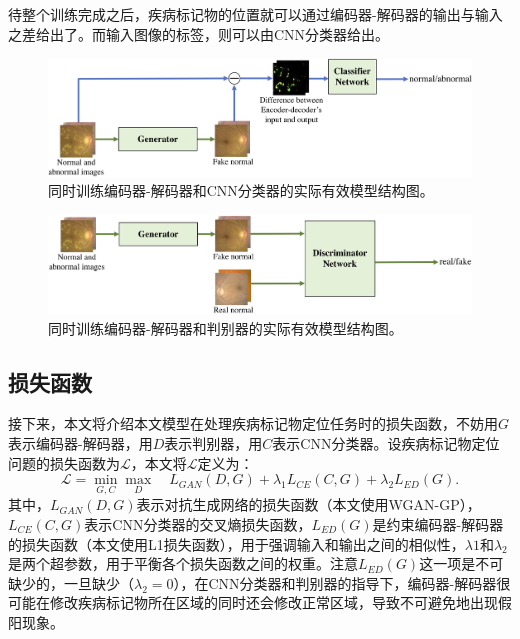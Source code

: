 待整个训练完成之后，疾病标记物的位置就可以通过编码器-解码器的输出与输入之差给出了。而输入图像的标签，则可以由CNN分类器给出。
\begin{figure}[h]
	\centering
	\includegraphics[width=1.0\textwidth]{figure/u_c_architecture.png}
	\caption{同时训练编码器-解码器和CNN分类器的实际有效模型结构图。}
	\label{fig:u_c_architecture}
\end{figure}
\begin{figure}[h]
	\centering
	\includegraphics[width=1.0\textwidth]{figure/u_d_architecture.png}
	\caption{同时训练编码器-解码器和判别器的实际有效模型结构图。}
	\label{fig:u_d_architecture}
\end{figure}
\subsection{损失函数}\label{subsec:loss_func}
接下来，本文将介绍本文模型在处理疾病标记物定位任务时的损失函数，不妨用$G$表示编码器-解码器，用$D$表示判别器，用$C$表示CNN分类器。设疾病标记物定位问题的损失函数为$\mathcal{L}$，本文将$\mathcal{L}$定义为：
\begin{equation}\label{equ:model_loss_func}
\mathcal{L}=\min _{G, C} \max _{D} \quad L_{GAN}(D, G)+\lambda_{1} L_{C E}(C, G)+\lambda_{2} L_{E D}(G).
\end{equation}
其中，$L_{GAN}(D, G)$表示对抗生成网络的损失函数（本文使用WGAN-GP），$L_{CE}(C, G)$表示CNN分类器的交叉熵损失函数，$L_{E D}(G)$是约束编码器-解码器的损失函数（本文使用L1损失函数），用于强调输入和输出之间的相似性，$\lambda{1}$和$\lambda_{2}$是两个超参数，用于平衡各个损失函数之间的权重。注意$L_{E D}(G)$这一项是不可缺少的，一旦缺少（$\lambda_{2}=0$），在CNN分类器和判别器的指导下，编码器-解码器很可能在修改疾病标记物所在区域的同时还会修改正常区域，导致不可避免地出现假阳现象。

